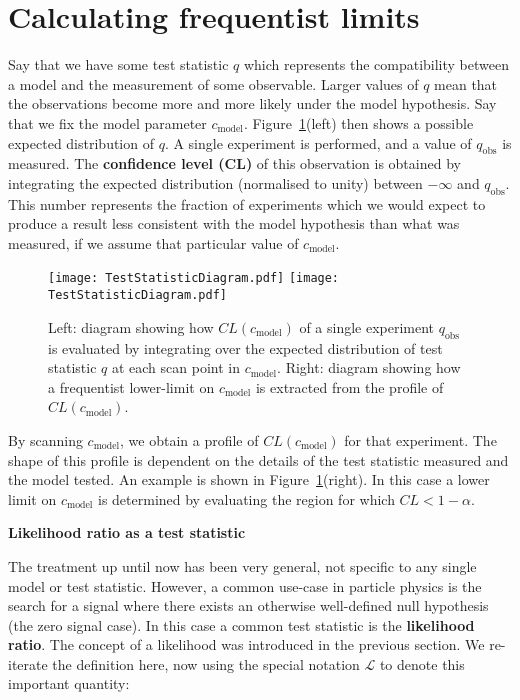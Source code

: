 \section{Calculating frequentist limits} \label{S. Calculating limits}

Say that we have some test statistic $q$ which represents the compatibility between a model and the measurement of some observable. Larger values of $q$ mean that the observations become more and more likely under the model hypothesis. Say that we fix the model parameter $c_\text{model}$. Figure~\ref{F. CL from test-stat}(left) then shows a possible expected distribution of $q$. A single experiment is performed, and a value of $q_\text{obs}$ is measured. The \textbf{confidence level (CL)} of this observation is obtained by integrating the expected distribution (normalised to unity) between $-\infty$ and $q_\text{obs}$. This number represents the fraction of experiments which we would expect to produce a result less consistent with the model hypothesis than what was measured, if we assume that particular value of $c_\text{model}$.

\begin{figure}[t!]
\centering
\texttt{[image: TestStatisticDiagram.pdf]}
\texttt{[image: TestStatisticDiagram.pdf]}
\caption{Left: diagram showing how $\textit{CL}\left(c_\text{model}\right)$ of a single experiment $q_\text{obs}$ is evaluated by integrating over the expected distribution of test statistic $q$ at each scan point in $c_\text{model}$. Right: diagram showing how a frequentist lower-limit on $c_\text{model}$ is extracted from the profile of  $\textit{CL}\left(c_\text{model}\right)$.}
\label{F. CL from test-stat}
\end{figure}

By scanning $c_\text{model}$, we obtain a profile of $\textit{CL}\left(c_\text{model}\right)$ for that experiment. The shape of this profile is dependent on the details of the test statistic measured and the model tested. An example is shown in Figure~\ref{F. CL from test-stat}(right). In this case a lower limit on $c_\text{model}$ is determined by evaluating the region for which $\textit{CL}<1-\alpha$.

\newpage
\noindent \textbf{Likelihood ratio as a test statistic}
\vspace{0.5cm}

The treatment up until now has been very general, not specific to any single model or test statistic. However, a common use-case in particle physics is the search for a signal where there exists an otherwise well-defined null hypothesis (the zero signal case). In this case a common test statistic is the \textbf{likelihood ratio}. The concept of a likelihood was introduced in the previous section. We re-iterate the definition here, now using the special notation $\mathcal{L}$ to denote this important quantity:


